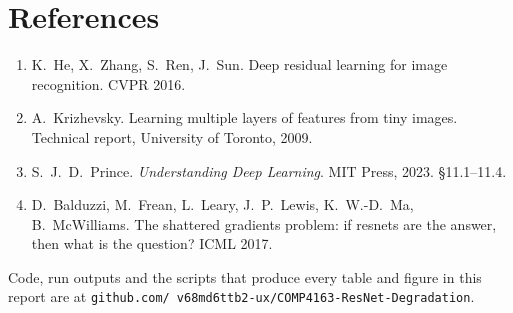 \documentclass[11pt,a4paper]{article}
\begin{document}
\vspace{2pt}

\vspace{2pt}
\section*{References}
{\small
\begin{enumerate}
\item K.~He, X.~Zhang, S.~Ren, J.~Sun. Deep residual learning for image
recognition. CVPR 2016.
\item A.~Krizhevsky. Learning multiple layers of features from tiny images.
Technical report, University of Toronto, 2009.
\item S.~J.~D.~Prince. \emph{Understanding Deep Learning}. MIT Press, 2023.
\S11.1--11.4.
\item D.~Balduzzi, M.~Frean, L.~Leary, J.~P.~Lewis, K.~W.-D.~Ma, B.~McWilliams.
The shattered gradients problem: if resnets are the answer, then what is the
question? ICML 2017.
\end{enumerate}
}

\noindent\footnotesize{Code, run outputs and the scripts that produce every table
and figure in this report are at \texttt{github.com/\allowbreak
v68md6ttb2-ux/\allowbreak COMP4163-ResNet-Degradation}.}
\end{document}
